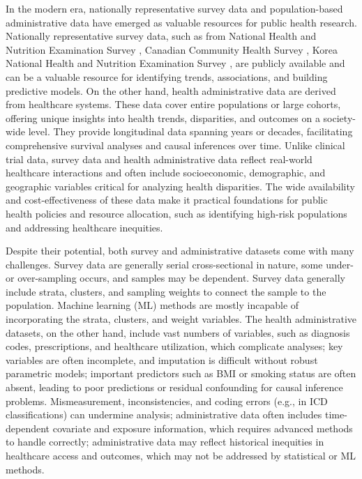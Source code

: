 In the modern era, nationally representative survey data and population-based administrative data have emerged as valuable resources for public health research. Nationally representative survey data, such as from National Health and Nutrition Examination Survey \citep{nhanes2024}, Canadian Community Health Survey \citep{cchs2024}, Korea National Health and Nutrition Examination Survey \citep{oh2021korea}, are publicly available and can be a valuable resource for identifying trends, associations, and building predictive models. On the other hand, health administrative data are derived from healthcare systems. These data cover entire populations or large cohorts, offering unique insights into health trends, disparities, and outcomes on a society-wide level. They provide longitudinal data spanning years or decades, facilitating comprehensive survival analyses and causal inferences over time. Unlike clinical trial data, survey data and health administrative data reflect real-world healthcare interactions and often include socioeconomic, demographic, and geographic variables critical for analyzing health disparities. The wide availability and cost-effectiveness of these data make it practical foundations for public health policies and resource allocation, such as identifying high-risk populations and addressing healthcare inequities.

Despite their potential, both survey and administrative datasets come with many challenges.  Survey data are generally serial cross-sectional in nature, some under- or over-sampling occurs, and samples may be dependent. Survey data generally include strata, clusters, and sampling weights to connect the sample to the population. Machine learning (ML) methods are mostly incapable of incorporating the strata, clusters, and weight variables. The health administrative datasets, on the other hand, include vast numbers of variables, such as diagnosis codes, prescriptions, and healthcare utilization, which complicate analyses; key variables are often incomplete, and imputation is difficult without robust parametric models; important predictors such as BMI or smoking status are often absent, leading to poor predictions or residual confounding for causal inference problems. Mismeasurement, inconsistencies, and coding errors (e.g., in ICD classifications) can undermine analysis; administrative data often includes time-dependent covariate and exposure information, which requires advanced methods to handle correctly; administrative data may reflect historical inequities in healthcare access and outcomes, which may not be addressed by statistical or ML methods.

